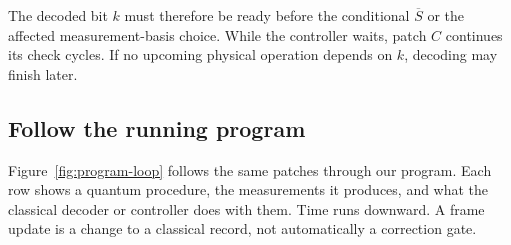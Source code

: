 \documentclass[11pt,a4paper]{article}
\begin{document}
The decoded bit $k$ must therefore be ready before the conditional
$\overline S$ or the affected measurement-basis choice. While the
controller waits, patch $C$ continues its check cycles. If no
upcoming physical operation depends on $k$, decoding may finish
later.

\subsection{Follow the running program}

Figure~\ref{fig:program-loop} follows the same patches through our
program. Each row shows a quantum procedure, the measurements it
produces, and what the classical decoder or controller does with them.
Time runs downward. A frame update is a change to a classical record,
not automatically a correction gate.
\end{document}
